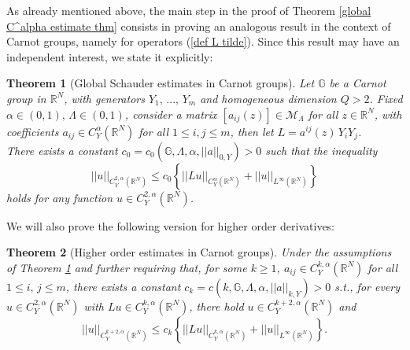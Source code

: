 \documentclass{article}
\newtheorem{theorem}{Theorem}[section]
\numberwithin{equation}{section}
\begin{document}
\vspace{2mm}

As already mentioned above, the main step in the proof of Theorem \ref{global C^alpha estimate thm} consists in proving an analogous result in the context of Carnot groups, namely for operators (\ref{def L tilde}). Since this result may have an independent interest, we state it explicitly:

\vspace{2mm}

\begin{theorem}[Global Schauder estimates in Carnot groups]
\label{1.4: Schauder est Carnot thm}
    Let $\mathbb{G}$ be a Carnot group in $\mathbb{R}^N$, with generators $Y_1, \, ..., \, Y_m$ and homogeneous dimension $Q>2$. Fixed $\alpha \in (0,1), \, \Lambda \in (0,1)$, consider a matrix $[a_{ij}(z)] \in \mathcal{M}_{\Lambda}$ for all $z \in \mathbb{R}^N$, with coefficients $a_{ij} \in C^{\alpha}_Y(\mathbb{R}^N)$ for all $1 \leq i,j \leq m$, then let $L = a^{ij}(z) \, Y_i Y_j$.
    \\
    There exists a constant $c_0=c_0(\mathbb{G}, \Lambda, \alpha, ||a||_{0,Y})>0$ such that the inequality
    \begin{equation}
    \label{Schauder est Carnot eqn}
        ||u||_{C^{2,\alpha}_Y(\mathbb{R}^N)} \leq c_0 \left\{ ||L u||_{C^{\alpha}_Y(\mathbb{R}^N)} + ||u||_{L^{\infty}(\mathbb{R}^N)} \right\}
    \end{equation}
    holds for any function $u \in C^{2,\alpha}_Y(\mathbb{R}^N)$.
\end{theorem}

\vspace{2mm}

\hspace{-7mm} We will also prove the following version for higher order derivatives:

\vspace{2mm}

\begin{theorem}[Higher order estimates in Carnot groups]
    \label{global est higher derivs thm}
    Under the assumptions of Theorem \ref{1.4: Schauder est Carnot thm} and further requiring that, for some $k \geq 1$, $a_{ij} \in C^{k,\alpha}_Y(\mathbb{R}^N)$ for all $1 \leq i, \, j \leq m$, there exists a constant $c_k=c(k,\mathbb{G}, \Lambda, \alpha, ||a||_{k,Y})>0$ s.t., for every $u \in C^{2,\alpha}_Y(\mathbb{R}^N)$ with $Lu \in C^{k,\alpha}_Y(\mathbb{R}^N)$, there hold $u \in C^{k+2,\alpha}_Y(\mathbb{R}^N)$ and
    \begin{equation}
        \label{est high order derivs ineq} ||u||_{C^{k+2,\alpha}_Y(\mathbb{R}^N)} \leq c_k \left\{ ||Lu||_{C^{k,\alpha}_Y(\mathbb{R}^N)} + ||u||_{L^{\infty}(\mathbb{R}^N)}\right\}.
    \end{equation}
\end{theorem}
\end{document}
